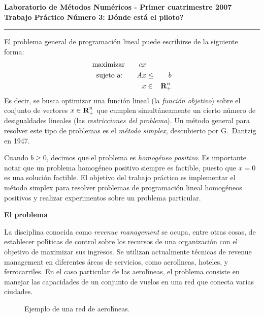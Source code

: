 \begin{centering}
\bf Laboratorio de M\'etodos Num\'ericos - Primer cuatrimestre 2007 \\
\bf Trabajo Pr\'actico N\'umero 3: D\'onde est\'a el piloto? \\
\end{centering}

\vskip 25pt
\hrule
\vskip 11pt

El problema general de programaci\'on lineal puede escribirse de la siguiente
forma:
\begin{eqnarray}
\hbox{maximizar} \qquad cx & & \nonumber \\
\hbox{sujeto a:} \qquad Ax & \le & b \nonumber \\
x & \in & \hbox{\bf R}^n_+ \nonumber
\end{eqnarray}
Es decir, se busca optimizar una funci\'on lineal (la \emph{funci\'on
objetivo}) sobre el conjunto de vectores $x\in\hbox{\bf R}^n_+$ que cumplen
simult\'aneamente un cierto n\'umero de desigualdades lineales (las
\emph{restricciones del problema}). Un m\'etodo general para resolver este
tipo de problemas es el \emph{m\'etodo simplex}, descubierto por G.~Dantzig
en 1947.

Cuando $b\ge 0$, decimos que el problema es \emph{homog\'eneo positivo}.
Es importante notar que un problema homog\'eneo positivo siempre es factible,
puesto que $x=0$ es una soluci\'on factible. El objetivo del trabajo
pr\'actico es implementar el m\'etodo simplex para resolver problemas de
programaci\'on lineal homog\'eneos positivos y realizar experimentos sobre
un problema particular.

\textbf{El problema}

La disciplina conocida como \emph{revenue management} se ocupa, entre otras
cosas, de establecer pol\'{\i}ticas de control sobre los recursos de una
organizaci\'on con el objetivo de maximizar sus ingresos. Se utilizan
actualmente t\'ecnicas de revenue management en diferentes \'areas de
servicios, como aerol\'{\i}neas, hoteles, y ferrocarriles. En el caso
particular de las aerol\'{\i}neas, el problema consiste en manejar las
capacidades de un conjunto de vuelos en una red que conecta varias ciudades.

\begin{figure}[h]
\begin{center}

\caption{Ejemplo de una red de aerol\'{\i}neas.}
\label{fig:Network}
\end{center}
\vspace*{-3mm}
\end{figure}

